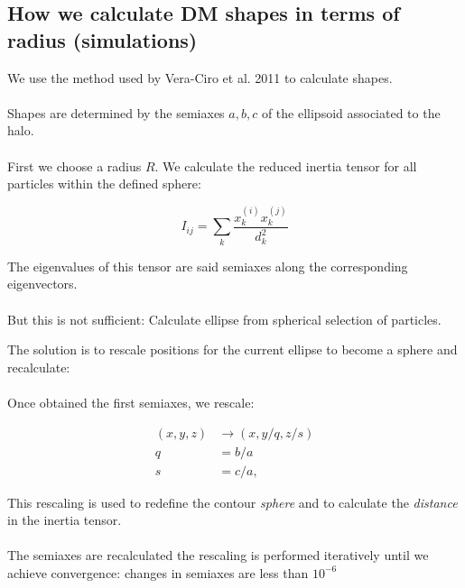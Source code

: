 \documentclass[xcolor=dvipsnames]{beamer}
\begin{document}
\subsection{How we calculate DM shapes in terms of radius (simulations)}
\begin{frame}
\footnotesize
We use the method used by Vera-Ciro et al. 2011 to calculate shapes.\\~\\

Shapes are determined by the semiaxes $a,b,c$ of the ellipsoid associated to the halo.\\~\\

First we choose a radius $R$. We calculate the reduced inertia tensor for all particles within the defined sphere:

\begin{equation}
I_{ij} = \sum_k \frac{x_k^{(i)}x_k^{(j)}}{d^2_k}
\end{equation}

The eigenvalues of this tensor are said semiaxes along the corresponding eigenvectors.\\~\\
But this is not sufficient: Calculate ellipse from spherical selection of particles.

\end{frame}


\begin{frame}
\small

The solution is to rescale positions for the current ellipse to become a sphere and recalculate:\\~\\

Once obtained the first semiaxes, we rescale:

\begin{align}
(x,y,z) &\rightarrow (x,y/q,z/s) \\
q &=  b/a\\
s &= c/a,
\end{align}

This rescaling is used to redefine the contour \textit{sphere} and to calculate the \textit{distance} in the inertia tensor.\\~\\

The semiaxes are recalculated the rescaling is performed iteratively until we achieve convergence: changes in semiaxes are less than $10^{-6}$


\end{frame}
\end{document}

